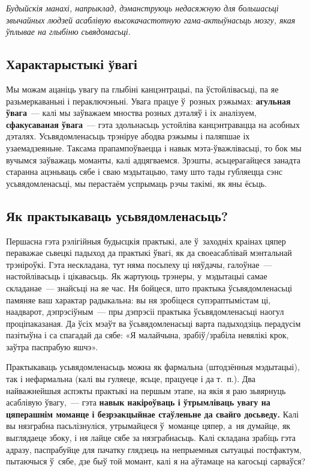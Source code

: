 \emph{Будыйскія манахі, напрыклад, дэманструюць недасяжную для большасьці звычайных людзей асаблівую высокачастотную гама-актыўнасьць мозгу, якая ўплывае на глыбіню сьвядомасьці.}

\subsection*{Характарыстыкі ўвагі}

Мы можам ацаніць увагу па глыбіні канцэнтрацыі, па ўстойлівасьці, па яе разьмеркаваньні і пераключэньні. Увага працуе ў~розных рэжымах: \textbf{агульная ўвага}~--- калі мы заўважаем мноства розных дэталяў і іх аналізуем, \textbf{сфакусаваная ўвага}~--- гэта здольнасьць устойліва канцэнтравацца на асобных дэталях. Усьвядомленасьць трэніруе абодва рэжымы і паляпшае іх узаемадзеяньне. Таксама прапампоўваецца і навык мэта-ўважлівасьці, то бок мы вучымся заўважаць моманты, калі адцягваемся. Зрэшты, асьцерагайцеся занадта старанна ацэньваць сябе і сваю мэдытацыю, таму што тады губляецца сэнс усьвядомленасьці, мы перастаём успрымаць рэчы такімі, як яны ёсьць.

\subsection*{Як практыкаваць усьвядомленасьць?}

Першасна гэта рэлігійныя будысцкія практыкі, але ў~заходніх краінах цяпер пераважае сьвецкі падыход да практыкі ўвагі, як да своеасаблівай мэнтальнай трэніроўкі. Гэта нескладана, тут няма посьпеху ці няўдачы, галоўнае~--- настойлівасьць і цікавасьць. Як жартуюць трэнеры, у~мэдытацыі самае складанае~--- знайсьці на яе час. Ня бойцеся, што практыка ўсьвядомленасьці памяняе ваш характар радыкальна: вы ня зробіцеся супэраптымістам ці, наадварот, дэпрэсіўным~--- пры дэпрэсіі практыка ўсьвядомленасьці наогул проціпаказаная. Да ўсіх мэаўт ва ўсьвядомленасьці варта падыходзіць перадусім пазітыўна і са спагадай да сябе: «Я малайчына, зрабіў/зрабіла невялікі крок, заўтра паспрабую яшчэ».

Практыкаваць усьвядомленасьць можна як фармальна (штодзённыя мэдытацыі), так і нефармальна (калі вы гуляеце, ясьце, працуеце і да т.~п.). Два найважнейшыя аспэкты практыкі на першым этапе, на якія я раю зьвярнуць асаблівую ўвагу,~--- гэта \textbf{навык накіроўваць і ўтрымліваць увагу на цяперашнім моманце і безрэакцыйнае стаўленьне да свайго досьведу.} Калі вы нязграбна пасьлізнуліся, утрымайцеся ў~моманце цяпер, а~ня думайце, як выглядаеце збоку, і ня лайце сябе за нязграбнасьць. Калі складана зрабіць гэта адразу, паспрабуйце для пачатку глядзець на непрыемныя сытуацыі постфактум, пытаючыся ў~сябе, дзе быў той момант, калі я на аўтамаце на кагосьці сарваўся?

